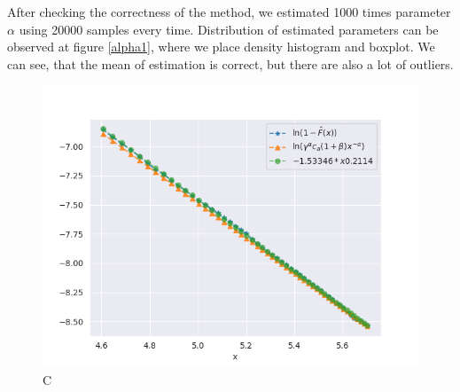 \documentclass{article}
\begin{document}
		After checking the correctness of the method, we estimated 1000 times parameter $\alpha$ using 20000 samples every time.
		Distribution of estimated parameters can be observed at figure \ref{alpha1}, where we place density histogram and boxplot.
		We can see, that the mean of estimation is correct, but there are also a lot of outliers.		 
		
		\begin{figure}[H]
			\centering
			\includegraphics[width=1\linewidth]{images/compare_cdf_plots_type_1.png}
			\caption{C}\label{tails1}
		\end{figure}
\end{document}
